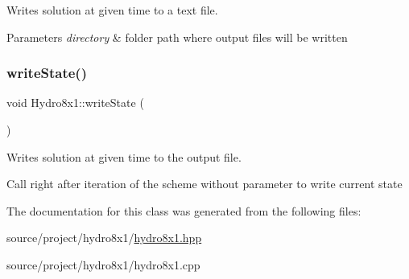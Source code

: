 Writes solution at given time to a text file. 


\begin{DoxyParams}{Parameters}
{\em directory} & folder path where output files will be written \\
\hline
\end{DoxyParams}
\mbox{\label{classHydro8x1_a37b7863b77dd7569e20c1c24aad3a36d}} 
\subsubsection{\texorpdfstring{write\+State()}{writeState()}\hspace{0.1cm}{\footnotesize\ttfamily [2/2]}}
{\footnotesize\ttfamily void Hydro8x1\+::write\+State (\begin{DoxyParamCaption}{ }\end{DoxyParamCaption})}



Writes solution at given time to the output file. 

Call right after iteration of the scheme without parameter to write current state 

The documentation for this class was generated from the following files\+:\begin{DoxyCompactItemize}
\item 
source/project/hydro8x1/\mbox{\hyperlink{hydro8x1_8hpp}{hydro8x1.\+hpp}}\item 
source/project/hydro8x1/hydro8x1.\+cpp\end{DoxyCompactItemize}
